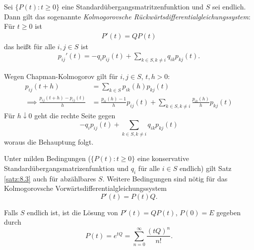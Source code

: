 \documentclass[a4paper,twoside,DIV15,BCOR12mm]{scrbook}
\begin{document}
\begin{satz}
\label{satz:8.3}
Sei $\{P(t) : t\ge 0\}$ eine Standardübergangsmatritzenfunktion und $S$ sei endlich. Dann gilt das sogenannte \emph{Kolmogorovsche Rückwärtsdifferentialgleichungssystem}: Für $t\ge 0$ ist
\begin{align*}
P'(t) = QP(t)
\end{align*}
das heißt für alle $i,j\in S$ ist
\begin{align*}
p_{ij}'(t) = -q_i p_{ij}(t) + \sum_{k\in S,k\ne i} q_{ik}p_{kj}(t).
\end{align*}
\end{satz}

\begin{beweis}
Wegen Chapman-Kolmogorov gilt für $i,j\in S$, $t,h>0$:
\begin{align*}
p_{ij}(t+h) &= \sum_{k\in S} p_{ik}(h) p_{kj}(t) \\
\implies \frac{p_{ij}(t+h) - p_{ij}(t)}h &=
\frac{p_{ii}(h) - 1}h p_{ij}(t) + \sum_{k\in S,k\ne i} \frac{p_{ik}(h)}h p_{kj}(t) 
\end{align*}
Für $h\downarrow0$ geht die rechte Seite gegen
\[
-q_i p_{ij}(t) + \sum_{k\in S,k\ne i}q_{ik}p_{kj}(t)
\]
woraus die Behauptung folgt.
\end{beweis}

\begin{bemerkung}
\begin{enuma}
\item Unter milden Bedingungen ($\{P(t): t\ge 0\}$ eine konservative Standardübergangsmatrizenfunktion und $q_i$ für alle $i\in S$ endlich) gilt Satz \ref{satz:8.3} auch für abzählbares $S$. Weitere Bedingungen sind nötig für das Kolmogorovsche Vorwärtsdifferentialgleichungssystem
\[
P'(t) = P(t)Q.
\]
\item Falls $S$ endlich ist, ist die Lösung von $P'(t) =QP(t)$, $P(0)=E$ gegeben durch
\[
P(t) =e^{tQ} = \sum_{n=0}^\infty \frac{(tQ)^n}{n!}.
\]
\end{enuma}

\end{bemerkung}
\end{document}
